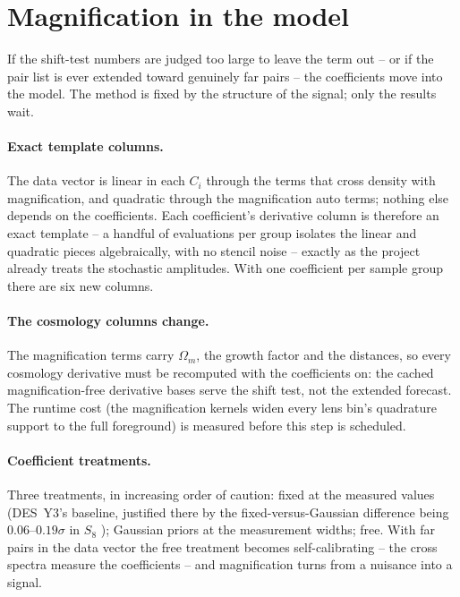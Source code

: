 \documentclass[11pt]{article}
\begin{document}
\section{Magnification in the model}
\label{sec:inmodel}

If the shift-test numbers are judged too large to leave the term out
-- or if the pair list is ever extended toward genuinely far pairs --
the coefficients move into the model.  The method is fixed by the
structure of the signal; only the results wait.

\paragraph{Exact template columns.}
The data vector is linear in each $C_i$ through the terms that cross
density with magnification, and quadratic through the magnification
auto terms; nothing else depends on the coefficients.  Each coefficient's derivative column is therefore
an exact template -- a handful of evaluations per group isolates the
linear and quadratic pieces algebraically, with no stencil noise --
exactly as the project already treats the stochastic amplitudes.
With one coefficient per sample group there are six new columns.

\paragraph{The cosmology columns change.}
The magnification terms carry $\Omega_m$, the growth factor and the
distances, so every cosmology derivative must be recomputed with the
coefficients on: the cached magnification-free derivative bases serve
the shift test, not the extended forecast.  The runtime cost (the
magnification kernels widen every lens bin's quadrature support to
the full foreground) is measured before this step is scheduled.

\paragraph{Coefficient treatments.}
Three treatments, in increasing order of caution: fixed at the
measured values (DES~Y3's baseline, justified there by the
fixed-versus-Gaussian difference being $0.06$--$0.19\sigma$ in $S_8$
\cite{ElvinPoole2022}); Gaussian priors at the measurement widths;
free.  With far pairs in the data vector the free treatment becomes
self-calibrating -- the cross spectra measure the coefficients
\cite{ElvinPoole2022, Sailer2025, MontanariDurrer2015} -- and
magnification turns from a nuisance into a signal.
\end{document}
